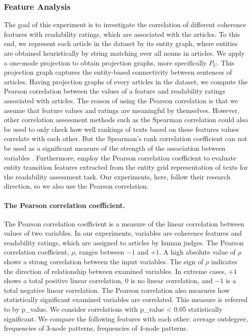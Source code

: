 \subsubsection{Feature Analysis}
The goal of this experiment is to investigate the correlation of different coherence features with  readability ratings, which are associated with the articles. 
To this end, we represent each article in the dataset by its entity graph, where entities are obtained heuristically by string matching over all nouns in articles. 
We apply a one-mode projection to obtain projection graphs, more specifically $P_U$. 
This projection graph captures the entity-based connectivity between sentences of articles. 
Having projection graphs of every articles in the dataset, we compute the Pearson correlation between the values of a feature and readability ratings associated with articles. 
The reason of using the Pearson correlation is that we assume that feature values and ratings are meaningful by themselves. 
However, other correlation assessment methods such as the Spearman correlation could also be used to only check how well rankings of texts based on these features values correlate with each other. 
But the Spearman's rank correlation coefficient can not be used as a significant measure of the strength of the association between variables \cite{hauke11}.
Furthermore,  employ the Pearson correlation coefficient to evaluate entity transition features extracted from the entity grid representation \cite{barzilay08} of texts for the readability assessment task. 
Our experiments, here, follow their research direction, so we also use the Pearson correlation. 

\paragraph{The Pearson correlation coefficient.} 
The Pearson correlation coefficient is a measure of the linear correlation between values of two variables. 
In our experiments, variables are coherence features and readability ratings, which are assigned to articles by human judges.  
The Pearson correlation coefficient, $\rho$, ranges between $-1$ and $+1$. 
A high absolute value of $\rho$ shows a strong correlation between the input variables. 
The sign of $\rho$ indicates the direction of relationship between examined variables. 
In extreme cases, $+1$ shows a total positive linear correlation, $0$ is no linear correlation, and $-1$ is a total negative linear correlation. 
The Pearson correlation also measures how statistically significant examined variables are correlated. 
This measure is referred to by p\_value. 
We consider correlations with p\_value < 0.05 statistically significant. 
We compare the following features with each other: average outdegree, frequencies of 3-node patterns, frequencies of 4-node patterns. 

